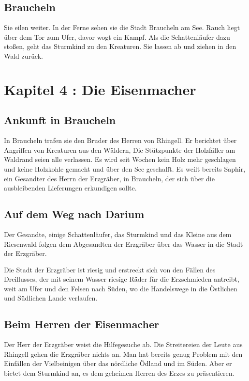 \documentclass[12pt,a4paper,onecolumn,twoside,ngerman]{book}
\begin{document}
\section{Braucheln}
Sie eilen weiter. In der Ferne sehen sie die Stadt Braucheln am See. Rauch liegt über dem Tor zum Ufer, davor wogt ein Kampf. Als die Schattenläufer dazu stoßen, geht das Sturmkind zu den Kreaturen. Sie lassen ab und ziehen in den Wald zurück.


\chapter{Kapitel 4 : Die Eisenmacher}
\section{Ankunft in Braucheln}
In Braucheln trafen sie den Bruder des Herren von Rhingell. Er berichtet über Angriffen von Kreaturen aus den Wäldern, Die Stützpunkte der Holzfäller am Waldrand seien alle verlassen. Es wird seit Wochen kein Holz mehr geschlagen und keine Holzkohle gemacht und über den See geschafft. Es weilt bereits Saphir, ein Gesandter des Herrn der Erzgräber, in Braucheln, der sich über die ausbleibenden Lieferungen erkundigen sollte.

\section{Auf dem Weg nach Darium}
Der Gesandte, einige Schattenläufer, das Sturmkind und das Kleine aus dem Riesenwald folgen dem Abgesandten der Erzgräber über das Wasser in die Stadt der Erzgräber.

Die Stadt der Erzgräber ist riesig und erstreckt sich von den Fällen des Dreiflusses, der mit seinem Wasser riesige Räder für die Erzschmieden antreibt, weit am Ufer und den Felsen nach Süden, wo die Handelswege in die Östlichen und Südlichen Lande verlaufen.

\section{Beim Herren der Eisenmacher}
Der Herr der Erzgräber weist die Hilfegesuche ab. Die Streitereien der Leute aus Rhingell gehen die Erzgräber nichts an. Man hat bereits genug Problem mit den Einfällen der Vielbeinigen über das nördliche Ödland und im Süden. Aber er bietet dem Sturmkind an, es dem geheimen Herren des Erzes zu präsentieren.
\end{document}
